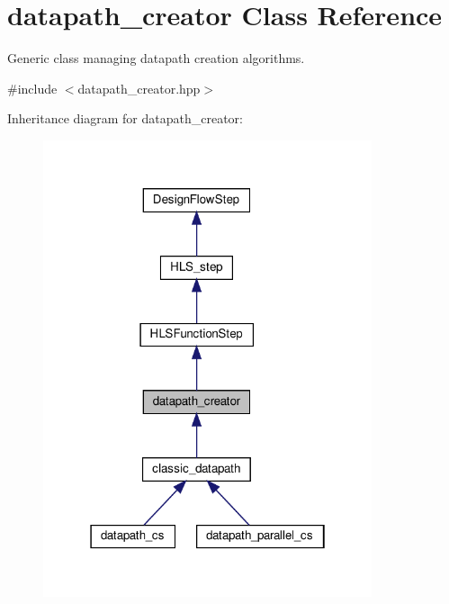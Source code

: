 \hypertarget{classdatapath__creator}{}\section{datapath\+\_\+creator Class Reference}
\label{classdatapath__creator}


Generic class managing datapath creation algorithms.  




{\ttfamily \#include $<$datapath\+\_\+creator.\+hpp$>$}



Inheritance diagram for datapath\+\_\+creator\+:
\nopagebreak
\begin{figure}[H]
\begin{center}
\leavevmode
\includegraphics[width=274pt]{d0/dab/classdatapath__creator__inherit__graph}
\end{center}
\end{figure}


